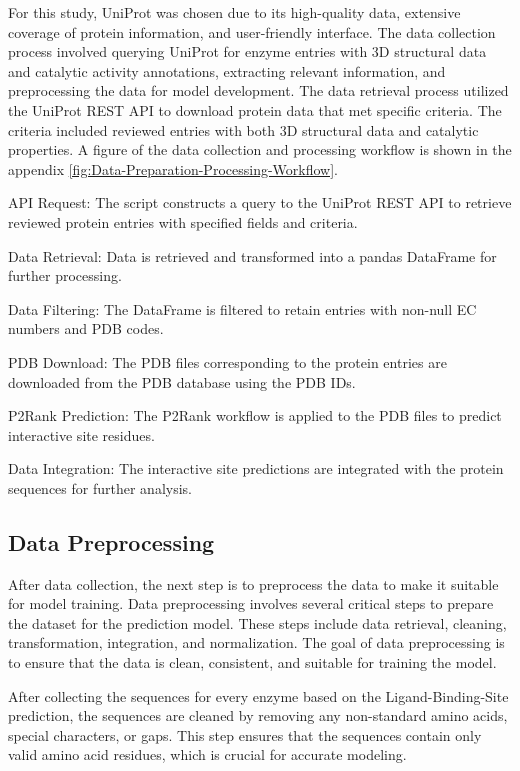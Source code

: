 For this study, UniProt was chosen due to its high-quality data, extensive coverage of protein information, and user-friendly interface. The data collection process involved querying UniProt for enzyme entries with 3D structural data and catalytic activity annotations, extracting relevant information, and preprocessing the data for model development. The data retrieval process utilized the UniProt REST API to download protein data that met specific criteria. The criteria included reviewed entries with both 3D structural data and catalytic properties. A figure of the data collection and processing workflow is shown in the appendix \ref{fig:Data-Preparation-Processing-Workflow}.


\begin{compactenum}
    \item API Request: The script constructs a query to the UniProt REST API to retrieve reviewed protein entries with specified fields and criteria.
    \item Data Retrieval: Data is retrieved and transformed into a pandas DataFrame for further processing.
    \item Data Filtering: The DataFrame is filtered to retain entries with non-null EC numbers and PDB codes.
    \item PDB Download: The PDB files corresponding to the protein entries are downloaded from the PDB database using the PDB IDs.
    \item P2Rank Prediction: The P2Rank workflow is applied to the PDB files to predict interactive site residues.
    \item Data Integration: The interactive site predictions are integrated with the protein sequences for further analysis.
\end{compactenum}

\subsection{Data Preprocessing}
\label{sec:Data Preprocessing}

After data collection, the next step is to preprocess the data to make it suitable for model training. Data preprocessing involves several critical steps to prepare the dataset for the prediction model. These steps include data retrieval, cleaning, transformation, integration, and normalization. The goal of data preprocessing is to ensure that the data is clean, consistent, and suitable for training the model.

After collecting the sequences for every enzyme based on the Ligand-Binding-Site prediction, the sequences are cleaned by removing any non-standard amino acids, special characters, or gaps. \autocite{OneletterNotationAmino1972} This step ensures that the sequences contain only valid amino acid residues, which is crucial for accurate modeling.

